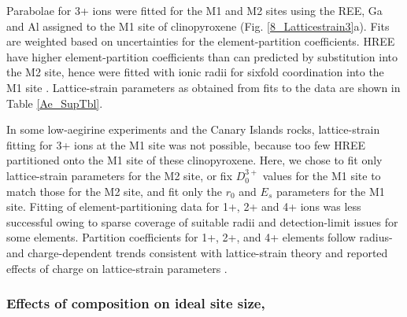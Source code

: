 \documentclass[final,authoryear,3p,times,twocolumn]{elsarticle}
\begin{document}
	\noindent Parabolae for 3+ ions were fitted for the M1 and M2 sites using the REE, Ga and Al assigned to the M1 site of clinopyroxene (Fig. \ref{8_Latticestrain3}a). Fits are weighted based on uncertainties for the element-partition coefficients. HREE have higher element-partition coefficients than can predicted by substitution into the M2 site, hence were fitted with ionic radii for sixfold coordination into the M1 site \citep[\textit{cf.}][]{Olin2010, Reguir2012}.
	Lattice-strain parameters as obtained from fits to the data are shown in Table \ref{Ae_SupTbl}.
	
In some low-aegirine experiments and the Canary Islands rocks, lattice-strain fitting for 3+ ions at the M1 site was not possible, because too few HREE partitioned onto the M1 site of these clinopyroxene. Here, we chose to fit only lattice-strain parameters for the M2 site, or fix $D_0^{3+}$ values for the M1 site to match those for the M2 site, and fit only the $r_0$ and $E_{s}$ parameters for the M1 site. Fitting of element-partitioning data for 1+, 2+ and 4+ ions was less successful owing to sparse coverage of suitable radii and detection-limit issues for some elements. Partition coefficients for 1+, 2+, and 4+ elements follow radius- and charge-dependent trends consistent with lattice-strain theory and reported effects of charge on lattice-strain parameters \citep[Fig. \ref{8_Latticestrain3}b, e.g.,][]{Hazen1979, Law2000, Adam2006}.


\subsubsection{Effects of composition on ideal site size, }
\end{document}
